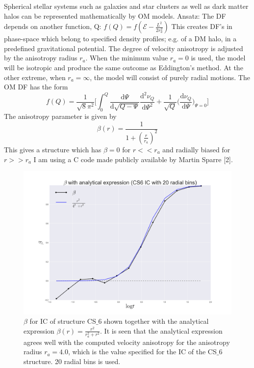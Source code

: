 Spherical stellar systems such as galaxies and star clusters as well as dark matter halos can be represented mathematically by OM models. Ansatz: The DF depends on another function, Q: $f(Q) = f(\mathcal{E} - \frac{L^2}{2r_a^2})$ This creates DF's in phase-space which belong to specified density profiles; e.g. of a DM halo, in a predefined gravitational potential. The degree of velocity anisotropy is adjusted by the anisotropy radius $r_a$. When the minimum value $r_a=0$ is used, the model will be isotropic and produce the same outcome as Eddington's method. At the other extreme, when $r_a=\infty$, the model will consist of purely radial motions. The OM DF has the form
\begin{equation} 
f(Q) = \frac{1}{\sqrt{8}\pi^2} \Bigg[ \int_{0}^{Q} \! \frac{\mathrm{d} \Psi}{\mathrm{d} \sqrt{Q-\Psi}}
\frac{\mathrm{d}^2 \nu_Q}{\mathrm{d} \Psi^2} + \frac{1}{\sqrt{Q}} \Bigg( \frac{\mathrm{d} \nu_Q}{\mathrm{d} \Psi} \Bigg)_{\Psi=0} \Bigg]
\end{equation}
The anisotropy parameter is given by 
\begin{equation} 
\beta(r) = \frac{1}{1+(\frac{r}{r_a})^2}
\end{equation}
This gives a structure which has $\beta = 0 $ for $r<<r_a$ and radially biased for $r>>r_a$ I am using a C code made publicly available by Martin Sparre [2].
\begin{figure}[!htbp]
\centering
\includegraphics[width=1.0\linewidth]{img/CS6_IC_beta_logr_fit.png}
\caption{$\beta$ for IC of structure CS$\_$6 shown together with the analytical expression $\beta(r)=\frac{r^2}{r_a^2+r^2}$. It is seen that the analytical expression agrees well with the computed velocity anisotropy for the anisotropy radius $r_a = 4.0$, which is the value specified for the IC of the CS$\_$6 structure. 20 radial bins is used.}
\label{fig:test}
\end{figure}

